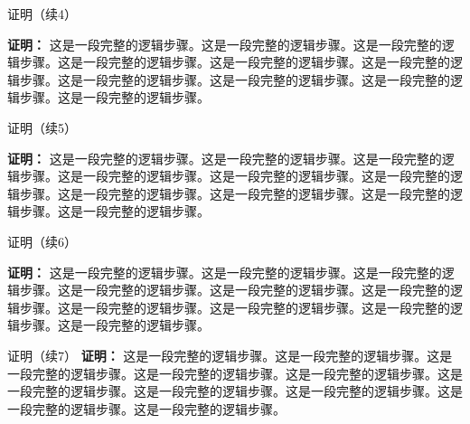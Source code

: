 \documentclass[aspectratio=169,10pt,fontset=fandol]{ctexbeamer}
\begin{document}
\begin{frame}[t,fragile]{证明（续4）}
\footnotesize
{\footnotesize
\textbf{证明：}
这是一段完整的逻辑步骤。这是一段完整的逻辑步骤。这是一段完整的逻辑步骤。这是一段完整的逻辑步骤。这是一段完整的逻辑步骤。这是一段完整的逻辑步骤。这是一段完整的逻辑步骤。这是一段完整的逻辑步骤。这是一段完整的逻辑步骤。这是一段完整的逻辑步骤。


}
\end{frame}
\begin{frame}[t,fragile]{证明（续5）}
\footnotesize
{\footnotesize
\textbf{证明：}
这是一段完整的逻辑步骤。这是一段完整的逻辑步骤。这是一段完整的逻辑步骤。这是一段完整的逻辑步骤。这是一段完整的逻辑步骤。这是一段完整的逻辑步骤。这是一段完整的逻辑步骤。这是一段完整的逻辑步骤。这是一段完整的逻辑步骤。这是一段完整的逻辑步骤。


}
\end{frame}
\begin{frame}[t,fragile]{证明（续6）}
\footnotesize
{\footnotesize
\textbf{证明：}
这是一段完整的逻辑步骤。这是一段完整的逻辑步骤。这是一段完整的逻辑步骤。这是一段完整的逻辑步骤。这是一段完整的逻辑步骤。这是一段完整的逻辑步骤。这是一段完整的逻辑步骤。这是一段完整的逻辑步骤。这是一段完整的逻辑步骤。这是一段完整的逻辑步骤。


}
\end{frame}
\begin{frame}[t,fragile]{证明（续7）}
\footnotesize
{\footnotesize
\textbf{证明：}
这是一段完整的逻辑步骤。这是一段完整的逻辑步骤。这是一段完整的逻辑步骤。这是一段完整的逻辑步骤。这是一段完整的逻辑步骤。这是一段完整的逻辑步骤。这是一段完整的逻辑步骤。这是一段完整的逻辑步骤。这是一段完整的逻辑步骤。这是一段完整的逻辑步骤。
}
\end{frame}
\end{document}
